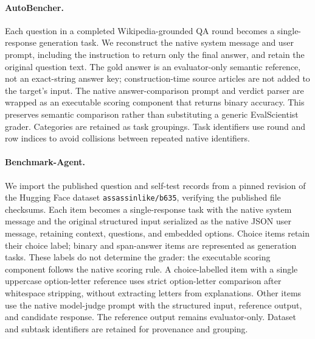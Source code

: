 \documentclass{article} %
\begin{document}
	\paragraph{AutoBencher.}
	Each question in a completed Wikipedia-grounded QA round becomes a
	single-response generation task. We reconstruct the native system message
	and user prompt, including the instruction to return only the final answer,
	and retain the original question text. The gold answer is an evaluator-only
	semantic reference, not an exact-string answer key; construction-time source
	articles are not added to the target's input. The native answer-comparison
	prompt and verdict parser are wrapped as an executable scoring component
	that returns binary accuracy. This preserves semantic comparison rather
	than substituting a generic EvalScientist grader. Categories are retained as task
	groupings. Task identifiers use round and row indices to avoid collisions
	between repeated native identifiers.

	\paragraph{Benchmark-Agent.}
	We import the published question and self-test records from a pinned revision
	of the Hugging Face dataset \texttt{assassinlike/b635}, verifying the published
	file checksums. Each item becomes a single-response task with the native
	system message and the original structured input serialized as the native
	JSON user message, retaining context, questions, and embedded options.
	Choice items retain their choice label; binary and span-answer items are
	represented as generation tasks. These labels do not determine the grader:
	the executable scoring component follows the native scoring rule. A
	choice-labelled item with a single uppercase option-letter reference uses
	strict option-letter comparison after whitespace stripping, without
	extracting letters from explanations. Other items use the native model-judge
	prompt with the structured input, reference output, and candidate response.
	The reference output remains evaluator-only. Dataset and subtask identifiers
	are retained for provenance and grouping.
\end{document}
